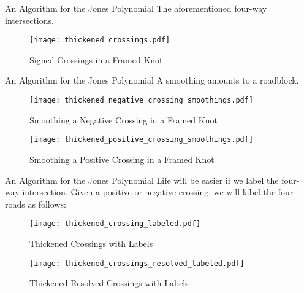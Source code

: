 \documentclass{beamer}
\begin{document}
    \begin{frame}{An Algorithm for the Jones Polynomial}
        The aforementioned four-way intersections.
        \begin{figure}
            \centering
            \texttt{[image: thickened\_crossings.pdf]}
            \caption{Signed Crossings in a Framed Knot}
            \label{fig:thickened_crossings}
        \end{figure}
    \end{frame}
    \begin{frame}{An Algorithm for the Jones Polynomial}
        A smoothing amounts to a roadblock.
        \begin{figure}
            \centering
            \texttt{[image: thickened\_negative\_crossing\_smoothings.pdf]}
            \caption{Smoothing a Negative Crossing in a Framed Knot}
            \label{fig:thickened_negative_crossing_smoothings}
        \end{figure}
        \begin{figure}
            \centering
            \texttt{[image: thickened\_positive\_crossing\_smoothings.pdf]}
            \caption{Smoothing a Positive Crossing in a Framed Knot}
            \label{fig:thickened_positive_crossing_smoothings}
        \end{figure}
    \end{frame}
    \begin{frame}{An Algorithm for the Jones Polynomial}
        Life will be easier if we label the four-way intersection. Given a
        positive or negative crossing, we will label the four roads as follows:
        \begin{figure}
            \centering
            \texttt{[image: thickened\_crossing\_labeled.pdf]}
            \caption{Thickened Crossings with Labels}
            \label{fig:thickened_crossings_labeled}
        \end{figure}
        \begin{figure}
            \centering
            \texttt{[image: thickened\_crossings\_resolved\_labeled.pdf]}
            \caption{Thickened Resolved Crossings with Labels}
            \label{fig:thickened_crossings_resolved_labeled}
        \end{figure}
    \end{frame}
\end{document}

